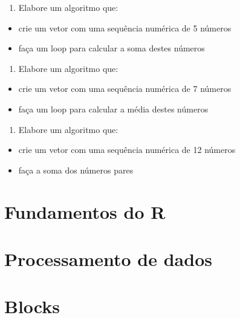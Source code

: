 \documentclass[
]{book}
\providecommand{\tightlist}{%
  \setlength{\itemsep}{0pt}\setlength{\parskip}{0pt}}
\theoremstyle{definition}
\theoremstyle{definition}
\theoremstyle{definition}
\theoremstyle{definition}
\theoremstyle{remark}
\begin{document}
\begin{enumerate}
\def\labelenumi{\arabic{enumi}.}
\setcounter{enumi}{3}
\tightlist
\item
  Elabore um algoritmo que:
\end{enumerate}

\begin{itemize}
\tightlist
\item
  crie um vetor com uma sequência numérica de 5 números
\item
  faça um loop para calcular a soma destes números
\end{itemize}

\begin{enumerate}
\def\labelenumi{\arabic{enumi}.}
\setcounter{enumi}{4}
\tightlist
\item
  Elabore um algoritmo que:
\end{enumerate}

\begin{itemize}
\tightlist
\item
  crie um vetor com uma sequência numérica de 7 números
\item
  faça um loop para calcular a média destes números
\end{itemize}

\begin{enumerate}
\def\labelenumi{\arabic{enumi}.}
\setcounter{enumi}{5}
\tightlist
\item
  Elabore um algoritmo que:
\end{enumerate}

\begin{itemize}
\tightlist
\item
  crie um vetor com uma sequência numérica de 12 números
\item
  faça a soma dos números pares
\end{itemize}

\hypertarget{fundamentos-do-r}{%
\chapter{Fundamentos do R}\label{fundamentos-do-r}}

\hypertarget{processamento-de-dados}{%
\chapter{Processamento de dados}\label{processamento-de-dados}}

\hypertarget{blocks}{%
\chapter{Blocks}\label{blocks}}
\end{document}
